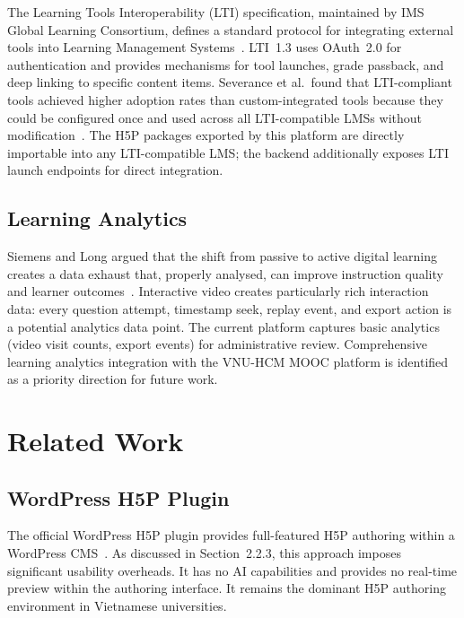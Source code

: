 The Learning Tools Interoperability (LTI) specification, maintained by IMS
Global Learning Consortium, defines a standard protocol for integrating
external tools into Learning Management Systems~\cite{lti2019}. LTI~1.3
uses OAuth~2.0 for authentication and provides mechanisms for tool
launches, grade passback, and deep linking to specific content items.
Severance et al.\ found that LTI-compliant tools achieved higher adoption
rates than custom-integrated tools because they could be configured once
and used across all LTI-compatible LMSs without modification~\cite{severance2010}.
The H5P packages exported by this platform are directly importable into any
LTI-compatible LMS; the backend additionally exposes LTI launch endpoints
for direct integration.

\subsection{Learning Analytics}

Siemens and Long argued that the shift from passive to active digital
learning creates a data exhaust that, properly analysed, can improve
instruction quality and learner outcomes~\cite{siemens2011}. Interactive
video creates particularly rich interaction data: every question attempt,
timestamp seek, replay event, and export action is a potential analytics
data point. The current platform captures basic analytics (video visit
counts, export events) for administrative review. Comprehensive learning
analytics integration with the VNU-HCM MOOC platform is identified as a
priority direction for future work.

\section{Related Work}

\subsection{WordPress H5P Plugin}

The official WordPress H5P plugin provides full-featured H5P authoring
within a WordPress CMS~\cite{h5p2023}. As discussed in Section~2.2.3, this
approach imposes significant usability overheads. It has no AI capabilities
and provides no real-time preview within the authoring interface. It remains
the dominant H5P authoring environment in Vietnamese universities.

